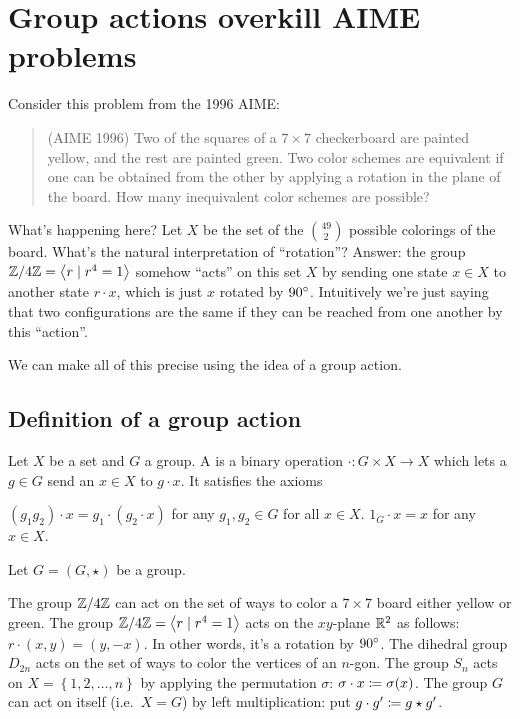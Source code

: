 \chapter{Group actions overkill AIME problems}
\label{ch:group_actions}
Consider this problem from the 1996 AIME:
\begin{quote}
	(AIME 1996) Two of the squares of a $7 \times 7$ checkerboard are painted yellow, and the rest are painted green. Two color schemes are equivalent if one can be obtained from the other by applying a rotation in the plane of the board. How many inequivalent color schemes are possible?
\end{quote}

What's happening here? Let $X$ be the set of the $\binom{49}{2}$ possible colorings of the board.
What's the natural interpretation of ``rotation''?
Answer: the group $\mathbb Z/4\mathbb Z = \left<r \mid r^4=1\right>$ somehow ``acts'' on this set $X$ by sending one state $x \in X$ to another state $r \cdot x$, which is just $x$ rotated by $90^\circ$.
Intuitively we're just saying that two configurations are the same if they can be reached from one another by this ``action''.

We can make all of this precise using the idea of a group action.

\section{Definition of a group action}

\begin{definition}
	Let $X$ be a set and $G$ a group.
	A  is a binary operation $\cdot \colon G \times X \to X$
	which lets a $g \in G$ send an $x \in X$ to $g \cdot x$.
	It satisfies the axioms
	\begin{itemize}
		\ii $(g_1g_2) \cdot x = g_1 \cdot (g_2 \cdot x)$ for any $g_1, g_2 \in G$
		for all $x \in X$.
		\ii $1_G \cdot x = x$ for any $x \in X$.
	\end{itemize}
\end{definition}

\begin{example}
	Let $G=(G,\star)$ be a group.
	\begin{enumerate}[(a)]
		\ii The group $\mathbb Z/4\mathbb Z$ can act on the set of ways to color a $7 \times 7$
		board either yellow or green.
		\ii The group $\mathbb Z/4\mathbb Z = \left<r \mid r^4=1\right>$ acts on the $xy$-plane $\mathbb R^2$ as follows: $r \cdot (x,y) = (y,-x)$.
		In other words, it's a rotation by $90^\circ$.
		\ii The dihedral group $D_{2n}$ acts on the set of ways to color the vertices of an $n$-gon.
		\ii The group $S_n$ acts on $X = \left\{ 1,2,\dots,n \right\}$
		by applying the permutation $\sigma$: $\sigma \cdot x \coloneqq \sigma(x)$.
		\ii The group $G$ can act on itself (i.e.\ $X=G$) by left multiplication: put $g \cdot g' \coloneqq g \star g'$.
	\end{enumerate}
\end{example}

